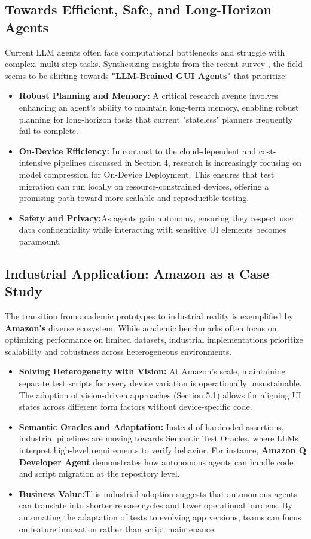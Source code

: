 \documentclass[acmsmall,nonacm]{acmart}
\begin{document}
\subsection{Towards Efficient, Safe, and Long-Horizon Agents}
Current LLM agents often face computational bottlenecks and struggle with complex, multi-step tasks. Synthesizing insights from the recent survey \cite{zhang2025largelanguagemodelbrainedgui}, the field seems to be shifting towards \textbf{"LLM-Brained GUI Agents"} that prioritize:
\begin{itemize}
    \item \textbf{Robust Planning and Memory:} A critical research avenue involves enhancing an agent's ability to maintain long-term memory, enabling robust planning for long-horizon tasks that current "stateless" planners frequently fail to complete.
    \item \textbf{On-Device Efficiency: }In contrast to the cloud-dependent and cost-intensive pipelines discussed in Section 4, research is increasingly focusing on model compression for On-Device Deployment. This ensures that test migration can run locally on resource-constrained devices, offering a promising path toward more scalable and reproducible testing.
    \item \textbf{Safety and Privacy:}As agents gain autonomy, ensuring they respect user data confidentiality while interacting with sensitive UI elements becomes paramount.
\end{itemize}

\subsection{Industrial Application: Amazon as a Case Study}
The transition from academic prototypes to industrial reality is exemplified by \textbf{Amazon’s} diverse ecosystem. While academic benchmarks often focus on optimizing performance on limited datasets, industrial implementations prioritize scalability and robustness across heterogeneous environments.
\begin{itemize}
    \item \textbf{Solving Heterogeneity with Vision: }At Amazon's scale, maintaining separate test scripts for every device variation is operationally unsustainable. The adoption of vision-driven approaches (Section 5.1) allows for aligning UI states across different form factors without device-specific code.
    \item \textbf{Semantic Oracles and Adaptation: }Instead of hardcoded assertions, industrial pipelines are moving towards Semantic Test Oracles, where LLMs interpret high-level requirements to verify behavior. For instance, \textbf{Amazon Q Developer Agent}\cite{prakash2025streamlineAWS} demonstrates how autonomous agents can handle code and script migration at the repository level.
    \item \textbf{Business Value:}This industrial adoption suggests that autonomous agents can translate into shorter release cycles and lower operational burdens. By automating the adaptation of tests to evolving app versions, teams can focus on feature innovation rather than script maintenance.
\end{itemize}
\end{document}
